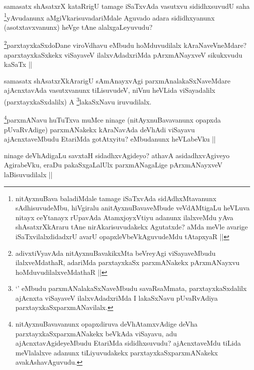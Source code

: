 \begin{artha}
samasatx shAsatxrX kataRrigU tamage iSaTxvAda vasutxvu sididhxsuvudU saha \footnote[1]{nitAyxnuBava baladiMdale tamage iSaTxvAda sidAdhxMtavanunx sAdhisuvudeMbu, hiVgiralu anitAyxnuBavaveMbude veVdAMtigaLu heVLuva nitayx ceYtanayx rUpavAda AtamxjoyxVtiyu adanunx ilalxveMdu yAva shAsatxrXkAraru tAne nirAkarisuvudakekx Agutatxde? aMda meVle avarige iSaTxvilalxdidadxrU avarU opapxleVbeVkAguvudeMdu tAtapxyaR ||}yAvudanunx aMgiVkarisuvadariMdale Aguvado adara sididhxyanunx (asotxtavxvanunx) heVge tAne alalxgaLeyuvudu?
\end{artha}

\begin{artha}
\footnote[1]{adivxtiVyavAda nitAyxnuBavakikxMta beVreyAgi viSayaveMbudu ilalxveMdathaR, adariMda parxtayxkaSx parxmANakekx pArxmANayxvu hoMduvudilalxveMdathaR ||}parxtayxkaSxdoDane viroVdhavu eMbudu hoMduvudilalx kAraNaveVneMdare? aparxtayxkaSxkekx viSayaveV ilalxvAdadxriMda pArxmANayxveV sikukxvudu kaSaTx ||
\end{artha}

\begin{artha}
samasatx shAsatxrXkArarigU sAmAnayxvAgi parxmAnalakaSxNaveMdare ajAcnxtavAda vasutxvanunx tiLisuvudeV, niVnu heVLida viSayadalilx (parxtayxkaSxdalilx) A \footnote[2]{`\stext' eMbudu parxmANalakaSxNaveMbudu savaRsaMmata, parxtayxkaSxdalilx ajAcnxta viSayaveV ilalxvAdadxriMda I lakaSxNavu pUvaRvAdiya parxtayxkaSxparxmANavilalx.}lakaSxNavu iruvudilalx.
\end{artha}

\begin{artha}
\footnote[3]{nitAyxnuBavavanunx opapxdiruva deVhAtamxvAdige deVha parxtayxkaSxparxmANakekx beVkAda viSayavu, adu ajAcnxtavAgideyeMbudu EtariMda sididhxsuvudu? ajAcnxtaveMdu tiLida meVlalalxve adanunx tiLiyuvudakekx parxtayxkaSxparxmANakekx avakAshavAguvudu.}parxmANavu huTuTxva muMce ninage (nitAyxnuBavavanunx opapxda pUvaRvAdige) parxmANakekx kAraNavAda deVhAdi viSayavu ajAcnxtaveMbudu EtariMda gotAtxyitu? eMbudanunx heVLabeVku ||
\end{artha}

\begin{artha}
ninage deVhAdigaLu savxtaH sidadhxvAgideyo? athavA asidadhxvAgiveyo AgirabeVku, eraDu pakaSxgaLalUlx parxmANagaLige pArxmANayxveV laBisuvudilalx ||
\end{artha}

